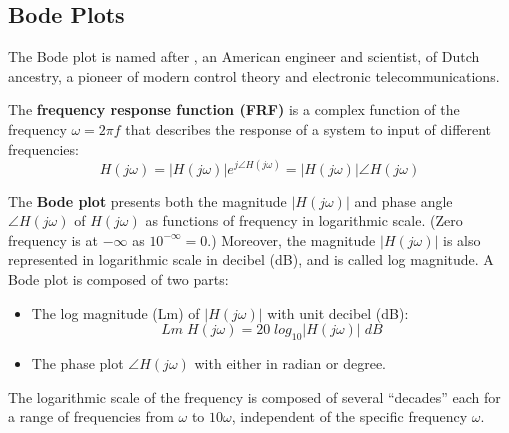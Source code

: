 \documentclass{article}
\begin{document}
\subsection*{Bode Plots}

The Bode plot is named after 
, an American engineer and scientist, of Dutch ancestry,
a pioneer of modern control theory and electronic telecommunications. 

The {\bf frequency response function (FRF)} is a complex function of the 
frequency $\omega=2\pi f$ that describes the response of a system to input of
different frequencies:
\begin{equation} H(j\omega)=|H(j\omega)|e^{j\angle H(j\omega)}=|H(j\omega)| \angle H(j\omega) \end{equation}

The {\bf Bode plot} presents both the magnitude $|H(j\omega)|$ and phase 
angle $\angle H(j\omega)$ of $H(j\omega)$ as functions of frequency in 
logarithmic scale. (Zero frequency is at $-\infty$ as $10^{-\infty}=0$.)
Moreover, the magnitude $| H(j\omega) |$ is also represented in logarithmic
scale in decibel (dB), and is called log magnitude.
A Bode plot is composed of two parts:
\begin{itemize}
  \item The log magnitude (Lm) of $|H(j\omega)|$ with unit decibel (dB):
  \begin{equation} Lm\; H(j\omega)=20 \;log_{10} |H(j\omega)|\;dB \end{equation}
  \item The phase plot $\angle H(j\omega)$ with either in radian or degree.
\end{itemize}
The logarithmic scale of the frequency is composed of several ``decades'' each 
for a range of frequencies from $\omega$ to $10 \omega$, independent of the 
specific frequency $\omega$.
\end{document}
